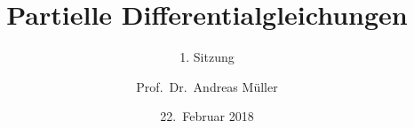 \documentclass[handout]{beamer}
\title[]{Partielle Differentialgleichungen}
\subtitle{1. Sitzung}
\date[22.~Februar 2018]{22.~Februar 2018}
\author{Prof.~Dr.~Andreas Müller}
\begin{document}
\begin{frame}
\titlepage

\end{frame}


\end{document}

